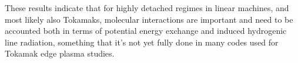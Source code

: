 These results indicate that for highly detached regimes in linear machines, and most likely also Tokamaks, molecular interactions are important and need to be accounted both in terms of potential energy exchange and induced hydrogenic line radiation, something that it’s not yet fully done in many codes used for Tokamak edge plasma studies.
